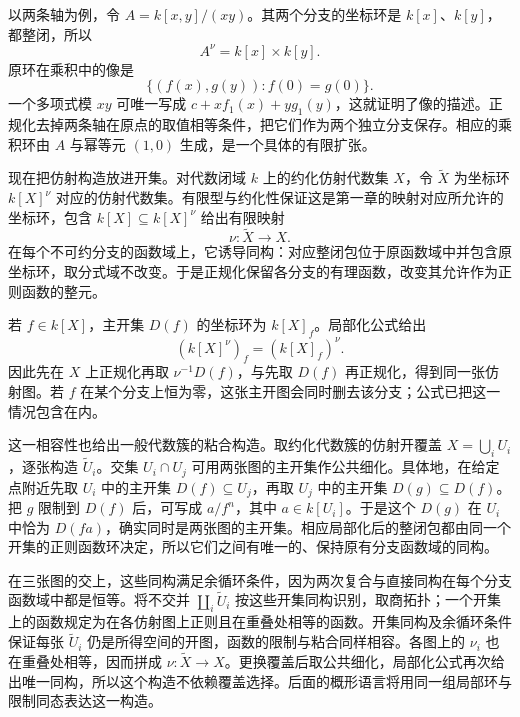 以两条轴为例，令 \(A=k[x,y]/(xy)\)。其两个分支的坐标环是 \(k[x]\)、\(k[y]\)，都整闭，所以
\[
	A^\nu=k[x]\times k[y].
\]
原环在乘积中的像是
\[
	\{(f(x),g(y)):f(0)=g(0)\}.
\]
一个多项式模 \(xy\) 可唯一写成 \(c+xf_1(x)+yg_1(y)\)，这就证明了像的描述。正规化去掉两条轴在原点的取值相等条件，把它们作为两个独立分支保存。相应的乘积环由 \(A\) 与幂等元 \((1,0)\) 生成，是一个具体的有限扩张。

\ProseParagraphBreak

现在把仿射构造放进开集。对代数闭域 \(k\) 上的约化仿射代数集 \(X\)，令
\(\widetilde X\) 为坐标环 \(k[X]^\nu\) 对应的仿射代数集。有限型与约化性保证这是第一章的映射对应所允许的坐标环，包含
\(k[X]\subseteq k[X]^\nu\) 给出有限映射
\[
	\nu:\widetilde X\longrightarrow X.
\]
在每个不可约分支的函数域上，它诱导同构：对应整闭包位于原函数域中并包含原坐标环，取分式域不改变。于是正规化保留各分支的有理函数，改变其允许作为正则函数的整元。

\ProseParagraphBreak

若 \(f\in k[X]\)，主开集 \(D(f)\) 的坐标环为 \(k[X]_f\)。局部化公式给出
\[
	(k[X]^\nu)_f=(k[X]_f)^\nu.
\]
因此先在 \(X\) 上正规化再取 \(\nu^{-1}D(f)\)，与先取 \(D(f)\) 再正规化，得到同一张仿射图。若 \(f\) 在某个分支上恒为零，这张主开图会同时删去该分支；公式已把这一情况包含在内。

\ProseParagraphBreak

这一相容性也给出一般代数簇的粘合构造。取约化代数簇的仿射开覆盖 \(X=\bigcup_i U_i\)，逐张构造 \(\widetilde U_i\)。交集 \(U_i\cap U_j\) 可用两张图的主开集作公共细化。具体地，在给定点附近先取 \(U_i\) 中的主开集 \(D(f)\subseteq U_j\)，再取 \(U_j\) 中的主开集 \(D(g)\subseteq D(f)\)。把 \(g\) 限制到 \(D(f)\) 后，可写成 \(a/f^n\)，其中 \(a\in k[U_i]\)。于是这个 \(D(g)\) 在 \(U_i\) 中恰为 \(D(fa)\)，确实同时是两张图的主开集。相应局部化后的整闭包都由同一个开集的正则函数环决定，所以它们之间有唯一的、保持原有分支函数域的同构。

\ProseParagraphBreak

在三张图的交上，这些同构满足余循环条件，因为两次复合与直接同构在每个分支函数域中都是恒等。将不交并 \(\coprod_i\widetilde U_i\) 按这些开集同构识别，取商拓扑；一个开集上的函数规定为在各仿射图上正则且在重叠处相等的函数。开集同构及余循环条件保证每张 \(\widetilde U_i\) 仍是所得空间的开图，函数的限制与粘合同样相容。各图上的 \(\nu_i\) 也在重叠处相等，因而拼成 \(\nu:\widetilde X\to X\)。更换覆盖后取公共细化，局部化公式再次给出唯一同构，所以这个构造不依赖覆盖选择。后面的概形语言将用同一组局部环与限制同态表达这一构造。

